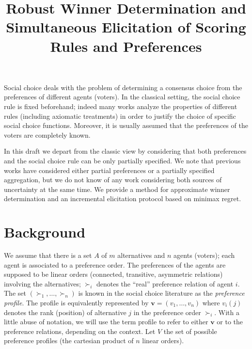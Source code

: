 \documentclass[12pt]{article}
\title{Robust Winner Determination and Simultaneous Elicitation of Scoring Rules and Preferences}
\author{}
\newcommand{\preflarge}{\boldsymbol{\succeq}^\textbf{r}}%
\newcommand{\pref}{{\succ}}%
\newcommand{\ppreflarge}{\succeq^\text{p}}%
\newcommand{\ppref}{\succ^\text{p}}%
\begin{document}
\maketitle


Social choice deals with the problem of determining a consensus choice from the preferences of different agents (voters).
In the classical setting, the social choice rule is fixed beforehand; indeed many works analyze the properties of different rules (including axiomatic treatments) in order to justify the choice of specific social choice functions. 
Moreover, it is usually assumed that the preferences of the voters are completely known. 

In this draft we depart from the classic view by considering that both preferences and the social choice rule can be only partially specified.
We note that previous works have considered either partial preferences or a partially specified aggregation, but we do not know of any work considering both sources of uncertainty at the same time.
We provide a method for approximate winner determination and an incremental elicitation protocol based on minimax regret. 


\section*{Background}

We assume that there is a set $A$ of $m$ alternatives and $n$ agents (voters); each agent is associated to a preference order.
The preferences of the agents are supposed to be linear orders (connected, transitive, asymmetric relations) involving the alternatives;
$\pref_i$ denotes the ``real'' preference relation of agent $i$. 
The set $(\pref_1,\ldots,\pref_n)$ is known in the social choice literature as the {\em preference  profile}.
The profile is equivalently represented by $\textbf{v}=(v_1,\ldots,v_n)$ where $v_i(j)$ denotes the rank (position) of alternative $j$ in the preference order $\pref_i$. 
With a little abuse of notation, we will use the term profile to refer to either $\textbf{v}$ or to the preference relations, depending on the context.
Let $V$ the set of possible preference profiles (the cartesian product of $n$ linear orders).
\end{document}
